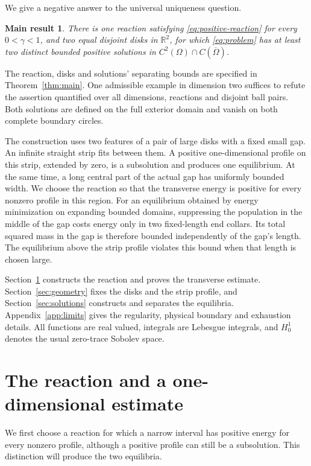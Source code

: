 \documentclass[11pt]{article}
\newcommand{\R}{\mathbb R}
\newtheorem*{informal}{Main result}
\begin{document}
We give a negative answer to the universal uniqueness question.
\begin{informal}
There is one reaction satisfying \eqref{eq:positive-reaction} for every
\(0<\gamma<1\), and two equal disjoint disks in \(\R^2\), for which
\eqref{eq:problem} has at least two distinct bounded positive solutions
in \(C^2(\Omega)\cap C(\overline\Omega)\).
\end{informal}
The reaction, disks and solutions' separating bounds are specified in
Theorem~\ref{thm:main}. One admissible example in dimension two suffices
to refute the assertion quantified over all dimensions, reactions and
disjoint ball pairs. Both solutions are defined on the full exterior
domain and vanish on both complete boundary circles.

The construction uses two features of a pair of large disks with a fixed
small gap. An infinite straight strip fits between them. A positive
one-dimensional profile on this strip, extended by zero, is a subsolution
and produces one equilibrium. At the same time, a long central part of
the actual gap has uniformly bounded width. We choose the reaction so
that the transverse energy is positive for every nonzero profile in this
region. For an equilibrium obtained by energy minimization on expanding
bounded domains, suppressing the population in the middle of the gap
costs energy only in two fixed-length end collars. Its total squared
mass in the gap is therefore bounded independently of the gap's length.
The equilibrium above the strip profile violates this bound when that
length is chosen large.

Section~\ref{sec:reaction} constructs the reaction and proves the
transverse estimate. Section~\ref{sec:geometry} fixes the disks and the
strip profile, and Section~\ref{sec:solutions} constructs and separates
the equilibria. Appendix~\ref{app:limits} gives the regularity, physical
boundary and exhaustion details.
All functions are real valued, integrals are Lebesgue integrals, and
\(H^1_0\) denotes the usual zero-trace Sobolev space.

\section{The reaction and a one-dimensional estimate}\label{sec:reaction}

We first choose a reaction for which a narrow interval has positive energy
for every nonzero profile, although a positive profile can still be a
subsolution. This distinction will produce the two equilibria.
\end{document}
